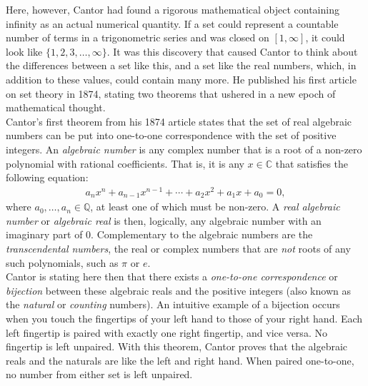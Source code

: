 Here, however, Cantor had found a rigorous mathematical object containing infinity as an actual numerical quantity. If a set could represent a countable number of terms in a trigonometric series and was closed on $[1,\infty]$, it could look like $\{1,2,3,\dots,\infty\}$. It was this discovery that caused Cantor to think about the differences between a set like this, and a set like the real numbers, which, in addition to these values, could contain many more. He published his first article on set theory in 1874, stating two theorems that ushered in a new epoch of mathematical thought. \\

Cantor's first theorem from his 1874 article states that the set of real algebraic numbers can be put into one-to-one correspondence with the set of positive integers. An \textit{algebraic number} is any complex number that is a root of a non-zero polynomial with rational coefficients. That is, it is any $x\in\mathbb{C}$ that satisfies the following equation:
\begin{align*}
a_nx^n+a_{n-1}x^{n-1}+\cdots+a_2x^2+a_1x+a_0=0,
\end{align*}
where $a_0,\dots,a_n\in\mathbb{Q}$, at least one of which must be non-zero. A \textit{real algebraic number} or \textit{algebraic real} is then, logically, any algebraic number with an imaginary part of $0$. Complementary to the algebraic numbers are the \textit{transcendental numbers}, the real or complex numbers that are \textit{not} roots of any such polynomials, such as $\pi$ or $e$. \\

Cantor is stating here then that there exists a \textit{one-to-one correspondence} or \textit{bijection} between these algebraic reals and the positive integers (also known as the \textit{natural} or \textit{counting} numbers). An intuitive example of a bijection occurs when you touch the fingertips of your left hand to those of your right hand. Each left fingertip is paired with exactly one right fingertip, and vice versa. No fingertip is left unpaired. With this theorem, Cantor proves that the algebraic reals and the naturals are like the left and right hand. When paired one-to-one, no number from either set is left unpaired. \\

